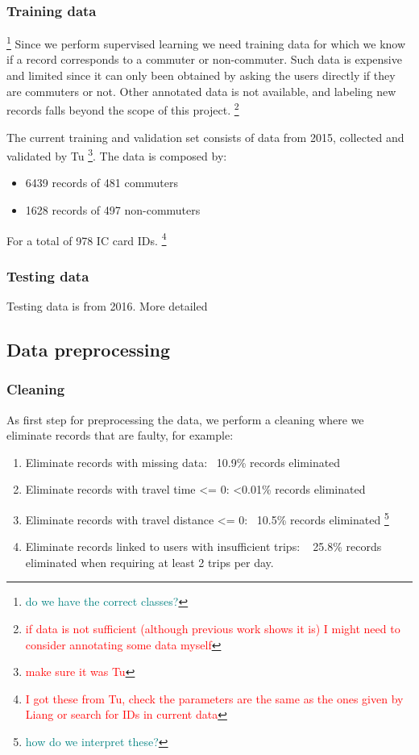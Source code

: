 \documentclass{article}
\newcommand{\selfnote}[1]{\footnote{\textcolor{red}{#1}}}
\newcommand{\domainDoubt}[1]{\footnote{\textcolor{teal}{#1}}}
\begin{document}
\subsubsection{Training data} \domainDoubt{do we have the correct classes?}
Since we perform supervised learning we need training data for which we know if a record corresponds to a commuter or non-commuter. Such data is expensive and limited since it can  only been obtained by asking the users directly if they are commuters or not. Other annotated data is not available, and labeling new records falls beyond the scope of this project. \selfnote{if data is not sufficient (although previous work shows it is) I might need to consider annotating some data myself}

The current training and validation set consists of data from 2015, collected and validated by Tu \cite{tu2016impact} \selfnote{make sure it was Tu}. The data is composed by:

\begin{itemize}
\item 6439 records of 481 commuters
\item 1628 records of 497 non-commuters
\end{itemize}

For a total of 978 IC card IDs. \selfnote{I got these from Tu, check the parameters are the same as the ones given by Liang or search for IDs in current data}

\subsubsection{Testing data}
Testing data is from 2016. More detailed

\subsection{Data preprocessing}
\subsubsection{Cleaning}
As first step for preprocessing the data, we perform a cleaning where we eliminate records that are faulty, for example: 

\begin{enumerate}
\item Eliminate records with missing data: ~10.9\% records eliminated
\item Eliminate records with travel time <= 0: <0.01\% records eliminated
\item Eliminate records with travel distance <= 0: ~10.5\% records eliminated \domainDoubt{how do we interpret these?}
\item Eliminate records linked to users with insufficient trips: ~ 25.8\% records eliminated when requiring at least 2 trips per day.
\end{enumerate}
\end{document}
